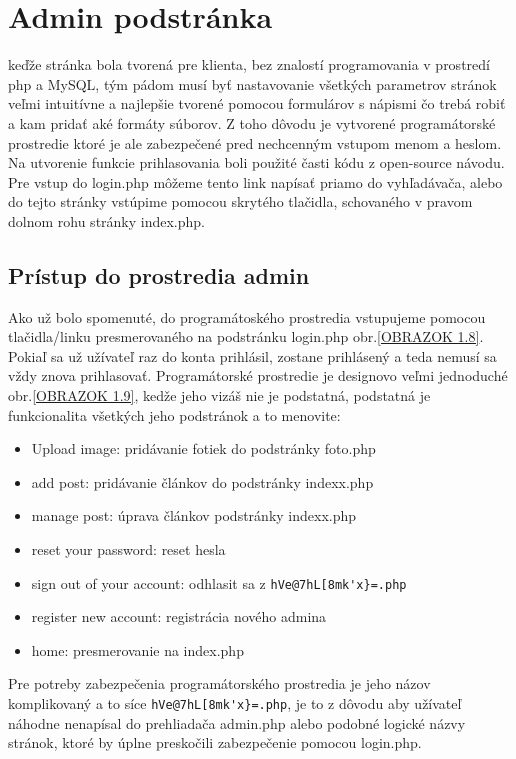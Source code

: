 \chapter{Admin podstránka}

keďže stránka bola tvorená pre klienta, bez znalostí programovania v prostredí php a MySQL, tým pádom musí byť nastavovanie všetkých parametrov stránok veľmi intuitívne a najlepšie tvorené pomocou formulárov s nápismi čo trebá robiť a kam pridať aké formáty súborov. Z toho dôvodu je vytvorené programátorské prostredie ktoré je ale zabezpečené pred nechcenným vstupom menom a heslom. Na utvorenie funkcie prihlasovania boli použité časti kódu z open-source návodu\cite{login}. Pre vstup do login.php môžeme tento link napísať priamo do vyhľadávača, alebo do tejto stránky vstúpime pomocou skrytého tlačidla, schovaného v pravom dolnom rohu stránky index.php.

\section{Prístup do prostredia admin}

Ako už bolo spomenuté, do programátoského prostredia vstupujeme pomocou tlačidla/linku presmerovaného na podstránku login.php obr.\ref{OBRAZOK 1.8}. Pokiaľ sa už užívateľ raz do konta prihlásil, zostane prihlásený a teda nemusí sa vždy znova prihlasovať. Programátorské prostredie je designovo veľmi jednoduché obr.\ref{OBRAZOK 1.9}, kedže jeho vizáš nie je podstatná, podstatná je funkcionalita všetkých jeho podstránok a to menovite:

\begin{itemize}
\item Upload image: pridávanie fotiek do podstránky foto.php
\item add post: pridávanie článkov do podstránky indexx.php
\item manage post: úprava článkov podstránky indexx.php
\item reset your password: reset hesla
\item sign out of your account: odhlasit sa z \verb|hVe@7hL[8mk'x}=.php|
\item register new account: registrácia nového admina
\item home: presmerovanie na index.php
\end{itemize}

Pre potreby zabezpečenia programátorského prostredia je jeho názov komplikovaný a to síce \verb|hVe@7hL[8mk'x}=.php|, je to z dôvodu aby užívateľ náhodne nenapísal do prehliadača admin.php alebo podobné logické názvy stránok, ktoré by úplne preskočili zabezpečenie pomocou login.php. 

